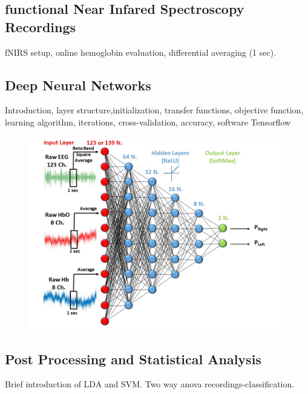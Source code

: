 \documentclass[12pt ]{iopart}
\begin{document}
\subsection{functional Near Infared Spectroscopy Recordings}
fNIRS setup, online hemoglobin evaluation, differential averaging (1 sec).
\subsection{Deep Neural Networks}
Introduction, layer structure,initialization, transfer functions, objective function, learning algorithm,  iterations, cross-validation,  accuracy, software Tensorflow
\begin{figure}
	\includegraphics[width=\linewidth]{Diapositiva3.JPG}
	\caption{}
	\label{fig:fig3}
\end{figure}
\subsection{Post Processing and Statistical Analysis}
Brief introduction of LDA and SVM.
Two way anova recordings-classification.


\subsection{}
\end{document}

